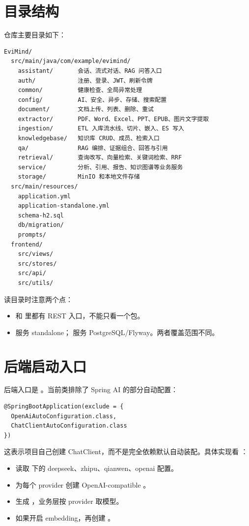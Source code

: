 \documentclass[UTF8,zihao=-4]{ctexart}
\begin{document}
\section{目录结构}

仓库主要目录如下：

\begin{lstlisting}[style=code]
EviMind/
  src/main/java/com/example/evimind/
    assistant/       会话、流式对话、RAG 问答入口
    auth/            注册、登录、JWT、刷新令牌
    common/          健康检查、全局异常处理
    config/          AI、安全、异步、存储、搜索配置
    document/        文档上传、列表、删除、重试
    extractor/       PDF、Word、Excel、PPT、EPUB、图片文字提取
    ingestion/       ETL 入库流水线、切片、嵌入、ES 写入
    knowledgebase/   知识库 CRUD、成员、检索入口
    qa/              RAG 编排、证据组合、回答与引用
    retrieval/       查询改写、向量检索、关键词检索、RRF
    service/         分析、引用、报告、知识图谱等业务服务
    storage/         MinIO 和本地文件存储
  src/main/resources/
    application.yml
    application-standalone.yml
    schema-h2.sql
    db/migration/
    prompts/
  frontend/
    src/views/
    src/stores/
    src/api/
    src/utils/
\end{lstlisting}

读目录时注意两个点：

\begin{itemize}
  \item {} 和  里都有 REST 入口，不能只看一个包。
  \item {} 服务 standalone； 服务 PostgreSQL/Flyway。两者覆盖范围不同。
\end{itemize}

\section{后端启动入口}

后端入口是 。当前类排除了 Spring AI 的部分自动配置：

\begin{lstlisting}[style=code]
@SpringBootApplication(exclude = {
  OpenAiAutoConfiguration.class,
  ChatClientAutoConfiguration.class
})
\end{lstlisting}

这表示项目自己创建 ChatClient，而不是完全依赖默认自动装配。具体实现看 ：

\begin{itemize}
  \item 读取  下的 deepseek、zhipu、qianwen、openai 配置。
  \item 为每个 provider 创建 OpenAI-compatible 。
  \item 生成 ，业务层按 provider 取模型。
  \item 如果开启 embedding，再创建 。
\end{itemize}
\end{document}
